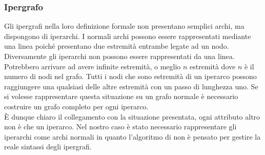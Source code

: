 \subsubsection*{Ipergrafo}
Gli ipergrafi nella loro definizione formale non presentano semplici archi, ma dispongono di iperarchi. I normali archi possono essere rappresentati mediante una linea poiché presentano due estremità entrambe legate ad un nodo. Diversamente gli iperarchi non possono essere rappresentati da una linea. Potrebbero arrivare ad avere infinite estremità, o meglio $n$ estremità dove $n$ è il numero di nodi nel grafo. Tutti i nodi che sono estremità di un iperarco possono raggiungere una qualsiasi delle altre estremità con un passo di lunghezza uno. Se si volesse rappresentare questa situazione su un grafo normale è necessario costruire un grafo completo per ogni iperarco.\\
È dunque chiaro il collegamento con la situazione presentata, ogni attributo altro non è che un iperarco. Nel nostro caso è stato necessario rappresentare gli iperarchi come archi normali in quanto l'algoritmo di \nv non è pensato per gestire la reale sintassi degli ipergrafi.
%
%
